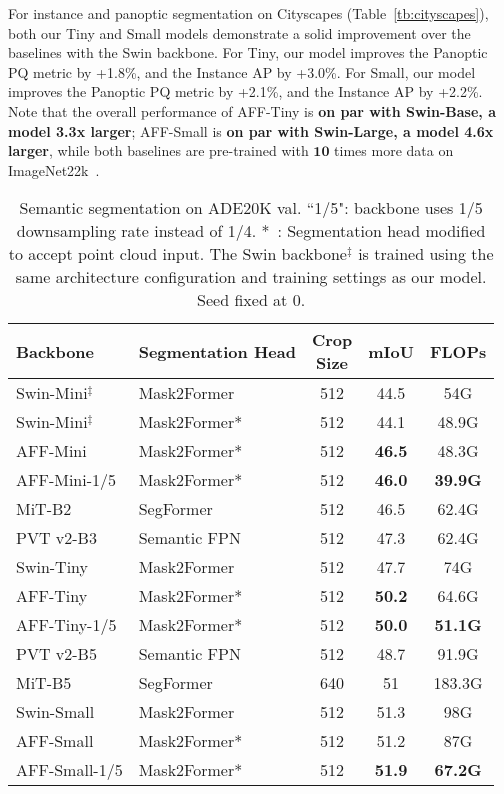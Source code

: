 \documentclass[10pt,twocolumn,letterpaper]{article}
\begin{document}
For instance and panoptic segmentation on Cityscapes (Table~\ref{tb:cityscapes}), both our Tiny and Small models demonstrate a solid improvement over the baselines with the Swin backbone. For Tiny, our model improves the Panoptic PQ metric by +1.8\%, and the Instance AP by +3.0\%. For Small, our model improves the Panoptic PQ metric by +2.1\%, and the Instance AP by +2.2\%. Note that the overall performance of AFF-Tiny is \textbf{on par with Swin-Base, a model 3.3x larger}; AFF-Small is \textbf{on par with Swin-Large, a model 4.6x larger}, while both baselines are pre-trained with $\mathbf{10}$ times more data on  ImageNet22k~\cite{imagenet21k}.

\begin{table}
\begin{center}
\begin{footnotesize}
\begin{tabular}{llccc}
Backbone & Segmentation Head & \makecell{Crop\\Size} & mIoU & FLOPs\\\hline
Swin-Mini$^{\ddagger}$ & Mask2Former~\cite{mask2} & 512 & 44.5 & 54G \\
Swin-Mini$^{\ddagger}$ & Mask2Former*~\cite{mask2} & 512 & 44.1 & 48.9G \\
\hdashline
AFF-Mini & Mask2Former*~\cite{mask2} & 512 & \textbf{46.5} & 48.3G \\
AFF-Mini-1/5 & Mask2Former*~\cite{mask2} & 512 & \textbf{46.0} & \textbf{39.9G} \\
\hline
MiT-B2 & SegFormer~\cite{segformer} & 512 & 46.5 & 62.4G \\
PVT v2-B3~\cite{pvtv2} & Semantic FPN~\cite{semanticfpn} & 512 & 47.3 & 62.4G \\
Swin-Tiny & Mask2Former~\cite{mask2} & 512 & 47.7 & 74G \\
\hdashline
AFF-Tiny & Mask2Former*~\cite{mask2} & 512 &  \textbf{50.2} & 64.6G \\
AFF-Tiny-1/5 & Mask2Former*~\cite{mask2} & 512 & \textbf{50.0} & \textbf{51.1G} \\
\hline
PVT v2-B5~\cite{pvtv2} & Semantic FPN~\cite{semanticfpn} & 512 & 48.7 & 91.9G \\
MiT-B5 & SegFormer~\cite{segformer} & 640 & 51 & 183.3G \\
Swin-Small & Mask2Former~\cite{mask2} & 512 & 51.3 & 98G \\
\hdashline
AFF-Small & Mask2Former*~\cite{mask2} & 512 & 51.2 & 87G \\
AFF-Small-1/5 & Mask2Former*~\cite{mask2} & 512 & \textbf{51.9} & \textbf{67.2G} \\
\hline
\end{tabular}
\end{footnotesize}
\end{center}
\vspace{-0.6cm}
\caption{Semantic segmentation on ADE20K val. ``1/5": backbone uses 1/5 downsampling rate instead of 1/4. *~: Segmentation head modified to accept point cloud input. 
The Swin backbone$^\ddagger$ is trained using the same architecture configuration and training settings as our model. Seed fixed at 0.
}
\label{tb:ade}
\vskip -0.1in
\end{table}
\end{document}
